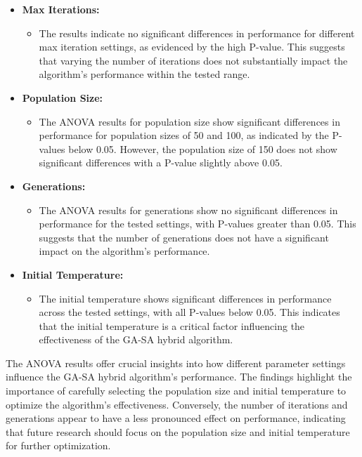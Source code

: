 \documentclass[
]{article}
\begin{document}
    \begin{itemize}
        \item \textbf{Max Iterations:}
        \begin{itemize}
            \item The results indicate no significant differences in performance for different max iteration settings, as evidenced by the high P-value. This suggests that varying the number of iterations does not substantially impact the algorithm's performance within the tested range.
        \end{itemize}
        \item \textbf{Population Size:}
        \begin{itemize}
            \item The ANOVA results for population size show significant differences in performance for population sizes of 50 and 100, as indicated by the P-values below 0.05. However, the population size of 150 does not show significant differences with a P-value slightly above 0.05.
        \end{itemize}
        \item \textbf{Generations:}
        \begin{itemize}
            \item The ANOVA results for generations show no significant differences in performance for the tested settings, with P-values greater than 0.05. This suggests that the number of generations does not have a significant impact on the algorithm's performance.
        \end{itemize}
        \item \textbf{Initial Temperature:}
        \begin{itemize}
            \item The initial temperature shows significant differences in performance across the tested settings, with all P-values below 0.05. This indicates that the initial temperature is a critical factor influencing the effectiveness of the GA-SA hybrid algorithm.
        \end{itemize}
    \end{itemize}

    The ANOVA results offer crucial insights into how different parameter settings influence the GA-SA hybrid algorithm's performance. The findings highlight the importance of carefully selecting the population size and initial temperature to optimize the algorithm's effectiveness. Conversely, the number of iterations and generations appear to have a less pronounced effect on performance, indicating that future research should focus on the population size and initial temperature for further optimization.
\end{document}

